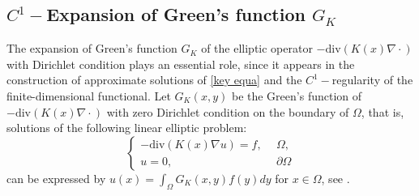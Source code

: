 \documentclass[12pt,reqno]{amsart}
\numberwithin{equation}{section}
\theoremstyle{definition}
\theoremstyle{remark}
\begin{document}
\subsection{$ C^1-$Expansion of Green's function $ G_K $}
The expansion of Green's function $ G_K $ of the elliptic operator $ -\text{div}(K(x)\nabla \cdot) $ with  Dirichlet condition  plays an essential role, since it appears in the construction of approximate solutions of \eqref{key equa} and the $ C^1-$regularity of the finite-dimensional functional.
Let $ G_K(x,y) $ be the Green's function of $ -\text{div}(K(x)\nabla \cdot) $ with zero Dirichlet condition on  the boundary of $ \Omega $, that is, solutions of the following linear elliptic problem:
\begin{equation}\label{diver form}
\begin{cases}
-\text{div}(K(x)\nabla u)= f,\ \ & \Omega,\\
u=0,\ \ & \partial \Omega
\end{cases}
\end{equation}
can be expressed by $ u(x)=\int_{\Omega}G_K(x,y)f(y)dy $ for $ x\in \Omega $, see \cite{GT}.
\end{document}
